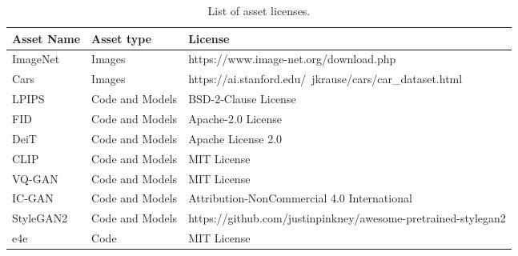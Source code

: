 \begin{table*}
\center
\begin{tabular}{lll}
\toprule
\textbf{Asset Name} & \textbf{Asset type} & \textbf{License} \\
\midrule
ImageNet & Images & https://www.image-net.org/download.php \\
Cars & Images & https://ai.stanford.edu/~jkrause/cars/car\_dataset.html\\
LPIPS & Code and Models & BSD-2-Clause License \\
FID & Code and Models & Apache-2.0 License \\
DeiT & Code and Models & Apache License 2.0 \\
CLIP & Code and Models & MIT License \\
VQ-GAN & Code and Models & MIT License \\
IC-GAN & Code and Models & Attribution-NonCommercial 4.0 International \\
StyleGAN2 & Code and Models & https://github.com/justinpinkney/awesome-pretrained-stylegan2 \\
e4e & Code &  MIT License \\
\bottomrule
\end{tabular}
\caption{List of asset licenses.}
\label{tab:licences}
\end{table*}